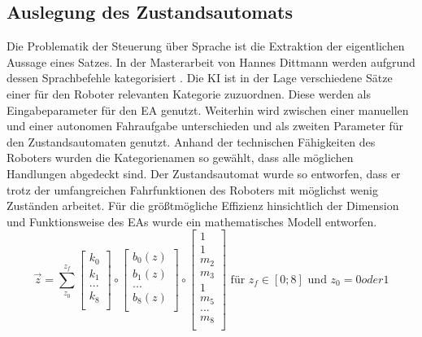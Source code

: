 	\subsection{Auslegung des Zustandsautomats}
	Die Problematik der Steuerung über Sprache ist die Extraktion der eigentlichen Aussage eines Satzes. In der Masterarbeit von Hannes Dittmann werden aufgrund dessen Sprachbefehle kategorisiert \cite{Dittmann}. Die KI ist in der Lage verschiedene Sätze einer für den Roboter relevanten Kategorie zuzuordnen. Diese werden als Eingabeparameter für den EA genutzt. Weiterhin wird zwischen einer manuellen und einer autonomen Fahraufgabe unterschieden und als zweiten Parameter für den Zustandsautomaten genutzt. Anhand der technischen Fähigkeiten des Roboters wurden die Kategorienamen so gewählt, dass alle möglichen Handlungen abgedeckt sind. Der Zustandsautomat wurde so entworfen, dass er trotz der umfangreichen Fahrfunktionen des Roboters mit möglichst wenig Zuständen arbeitet. Für die größtmögliche Effizienz hinsichtlich der Dimension und Funktionsweise des EAs wurde ein mathematisches Modell entworfen.\\
	
	\begin{equation}
	\vec{z}=\sum_{z_0}^{z_f} \left[ \begin{array}{r}
	k_0  \\
	k_{1}  \\
	...  \\
	k_8  \\
	\end{array}\right] \circ
	\left[ \begin{array}{r}
	b_0(z)  \\
	b_{1}(z)  \\
	...  \\
	b_8(z)  \\
	\end{array}\right]  \circ
	\left[ \begin{array}{r}
	1  \\
	1  \\
	m_{2}  \\
	m_{3}   \\
	1  \\
	m_{5}   \\
	...   \\
	m_{8}  \\
	\end{array}\right]
	\text{ für }z_f\in[0;8] \text{ und }z_0=0 oder 1
	\label{eq: statemachine}
	\end{equation}\\
	
